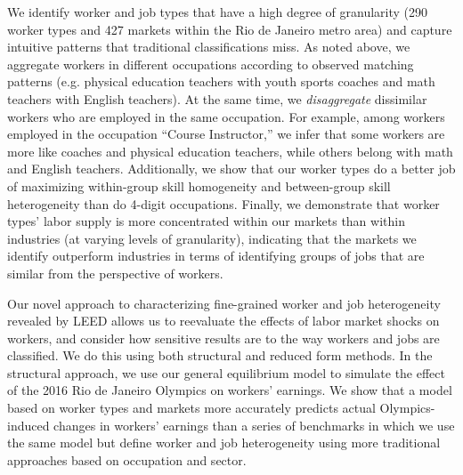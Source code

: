 \documentclass[12pt]{article}
\theoremstyle{definition}
\theoremstyle{plain}
\begin{document}

We identify worker and job types that have a high degree of granularity (290 worker types and 427 markets within the Rio de Janeiro metro area) and capture intuitive patterns that traditional classifications miss. As noted above, we aggregate workers in different occupations according to observed matching patterns (e.g. physical education teachers with youth sports coaches and math teachers with English teachers). At the same time, we \emph{disaggregate} dissimilar workers who are employed in the same occupation. For example, among workers employed in the occupation ``Course Instructor,'' we infer that some workers are more like coaches and physical education teachers, while others belong with math and English teachers. Additionally, we show that our worker types do a better job of maximizing within-group skill homogeneity and between-group skill heterogeneity than do 4-digit occupations.  Finally, we demonstrate that worker types' labor supply is more concentrated within our markets than within industries (at varying levels of granularity), indicating that the markets we identify outperform industries in terms of identifying groups of jobs that are similar from the perspective of workers.  

Our novel approach to characterizing fine-grained worker and job heterogeneity revealed by LEED allows us to reevaluate the effects of labor market shocks on workers, and consider how sensitive results are to the way workers and jobs are classified. We do this using both structural and reduced form methods. In the structural approach, we use our general equilibrium model to simulate the effect of the 2016 Rio de Janeiro Olympics on workers' earnings. We show that a model based on worker types and markets more accurately predicts actual Olympics-induced changes in workers' earnings than a series of benchmarks in which we use the same model but define worker and job heterogeneity using more traditional approaches based on occupation and sector. 
\end{document}
